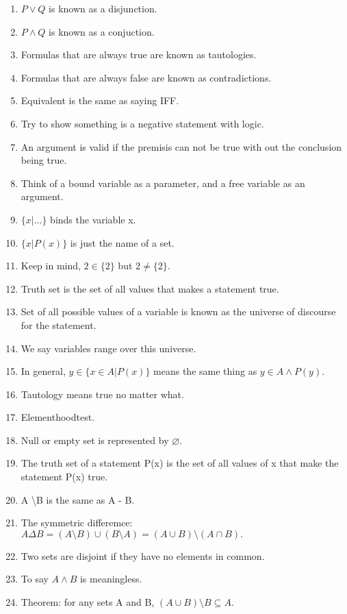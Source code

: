 \documentclass{article}
\begin{document}
	\begin{enumerate}
		\item  $P \lor Q$ is known as a disjunction.
		\item $P \land Q$ is known as a conjuction.
		\item Formulas that are always true are known as tautologies.
		\item Formulas that are always false are known as contradictions.
		\item Equivalent is the same as saying IFF.
	  \item Try to show something is a negative statement with logic.
	  \item An argument is valid if the premisis can not be true with out the conclusion being true.
	  \item Think of a bound variable as a parameter, and a free variable as an argument.
	  \item $\{x | \ldots\}$ binds the variable x.
	  \item$\{x | P(x)\}$ is just the name of a set.
	  \item Keep in mind, $2 \in \{2\}$ but $2 \neq \{2\}$.
	  \item Truth set is the set of all values that makes a statement true.
	  \item Set of all possible values of a variable is known as the universe of discourse for the statement.
	  \item We say variables range over this universe.
	  \item In general, $y \in \{x \in A | P(x)\}$ means the same thing as $y \in A \land P(y)$.
	  \item Tautology means true no matter what.
	  \item Elementhoodtest.
	  \item Null or empty set is represented by $\varnothing$.
	  \item The truth set of a statement P(x) is the set of all values of x that make the statement P(x) true.
	  \item A \textbackslash B is the same as A - B.
	  \item The symmetric differemce: $A \Delta B = (A \setminus B) \cup (B \setminus A) = (A \cup B) \setminus (A \cap B).$
	  \item Two sets are disjoint if they have no elements in common.
	  \item To say $A \land B$ is meaningless.
	  \item Theorem: for any sets A and B, $(A \cup B) \setminus B \subseteq A$.

\end{enumerate}
\end{document}
